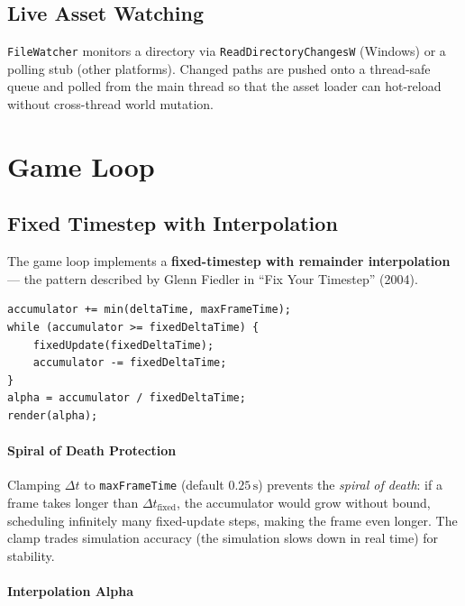 \documentclass[12pt, a4paper]{report}
\theoremstyle{definition}
\theoremstyle{remark}
\begin{document}
\section{Live Asset Watching}

\texttt{FileWatcher} monitors a directory via
\texttt{ReadDirectoryChangesW} (Windows) or a polling stub (other
platforms). Changed paths are pushed onto a thread-safe queue and polled
from the main thread so that the asset loader can hot-reload without
cross-thread world mutation.

\chapter{Game Loop}

\section{Fixed Timestep with Interpolation}

The game loop implements a \textbf{fixed-timestep with remainder
interpolation} — the pattern described by Glenn Fiedler in
``Fix Your Timestep'' (2004).

\begin{lstlisting}[caption={Game loop tick}]
accumulator += min(deltaTime, maxFrameTime);
while (accumulator >= fixedDeltaTime) {
    fixedUpdate(fixedDeltaTime);
    accumulator -= fixedDeltaTime;
}
alpha = accumulator / fixedDeltaTime;
render(alpha);
\end{lstlisting}

\subsubsection{Spiral of Death Protection}

Clamping $\Delta t$ to \texttt{maxFrameTime} (default $0.25\,\text{s}$)
prevents the \emph{spiral of death}: if a frame takes longer than
$\Delta t_\text{fixed}$, the accumulator would grow without bound,
scheduling infinitely many fixed-update steps, making the frame even
longer. The clamp trades simulation accuracy (the simulation slows
down in real time) for stability.

\subsubsection{Interpolation Alpha}
\end{document}
